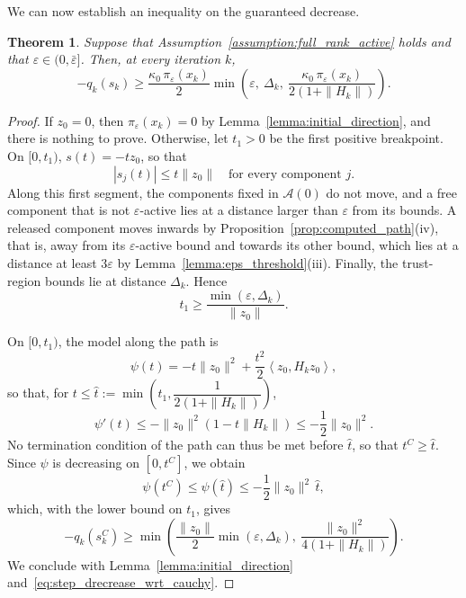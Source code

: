 \documentclass[pdflatex,sn-mathphys-num]{sn-jnl}%
\theoremstyle{thmstyleone}%
\newtheorem{theorem}{Theorem}%
\newcommand{\calA}{{\mathcal{A}}}
\newcommand{\inner}[2]{\left\langle {#1} , {#2} \right\rangle} %
\begin{document}
We can now establish an inequality on the guaranteed decrease.
\begin{theorem}\label{theo:cauchy_decrease}
	Suppose that Assumption~\ref{assumption:full_rank_active} holds and that $\varepsilon \in (0,\bar\varepsilon]$. Then, at every iteration $k$,
	\begin{equation}\label{eq:bound_step_decrease}
		-q_k(s_k) \ge \frac{\kappa_0\,\pi_\varepsilon(x_k)}{2}\min\left(\varepsilon,\ \Delta_k,\ \frac{\kappa_0\,\pi_\varepsilon(x_k)}{2(1+\|H_k\|)}\right).
	\end{equation}
\end{theorem}
\begin{proof}
	If $z_0 = 0$, then $\pi_\varepsilon(x_k) = 0$ by Lemma~\ref{lemma:initial_direction}, and there is nothing to prove. Otherwise, let $t_1 > 0$ be the first positive breakpoint. On $[0,t_1)$, $s(t) = -tz_0$, so that
	\[|s_j(t)| \le t\|z_0\| \quad \text{for every component } j.\]
	Along this first segment, the components fixed in $\calA(0)$ do not move, and a free component that is not $\varepsilon$-active lies at a distance larger than $\varepsilon$ from its bounds. A released component moves inwards by Proposition~\ref{prop:computed_path}(iv), that is, away from its $\varepsilon$-active bound and towards its other bound, which lies at a distance at least $3\varepsilon$ by Lemma~\ref{lemma:eps_threshold}(iii). Finally, the trust-region bounds lie at distance $\Delta_k$. Hence
	\[t_1 \ge \frac{\min(\varepsilon,\Delta_k)}{\|z_0\|}.\]

	On $[0,t_1)$, the model along the path is
	\[\psi(t) = -t\|z_0\|^2 + \frac{t^2}{2}\inner{z_0}{H_kz_0},\]
	so that, for $t \le \hat{t} := \min\left(t_1, \dfrac{1}{2(1+\|H_k\|)}\right)$,
	\[\psi'(t) \le -\|z_0\|^2\left(1 - t\|H_k\|\right) \le -\frac{1}{2}\|z_0\|^2.\]
	No termination condition of the path can thus be met before $\hat{t}$, so that $t^C \ge \hat{t}$. Since $\psi$ is decreasing on $[0,t^C]$, we obtain
	\[\psi(t^C) \le \psi(\hat{t}) \le -\frac{1}{2}\|z_0\|^2\,\hat{t},\]
	which, with the lower bound on $t_1$, gives
	\[-q_k(s_k^C) \ge \min\left(\frac{\|z_0\|}{2}\min(\varepsilon,\Delta_k),\ \frac{\|z_0\|^2}{4(1+\|H_k\|)}\right).\]
	We conclude with Lemma~\ref{lemma:initial_direction} and~\eqref{eq:step_drecrease_wrt_cauchy}.
\end{proof}
\end{document}
